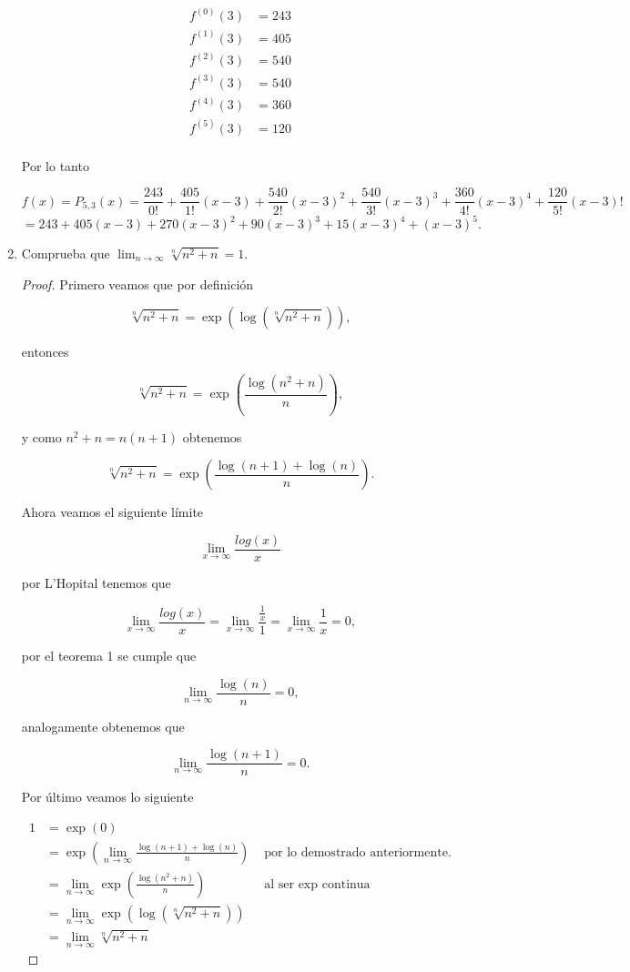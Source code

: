 \documentclass[letterpaper]{article}
\theoremstyle{definition}
\theoremstyle{lemathm}
\theoremstyle{lemademthm}
\newcommand{\limxinf}{\lim_{x\to\infty}}
\newcommand{\limninf}{\lim_{n\to\infty}}
\begin{document}
\begin{enumerate}
		\begin{align*}
			f^{(0)}(3) &= 243\\
			f^{(1)}(3) &= 405\\
			f^{(2)}(3) &= 540\\
			f^{(3)}(3) &= 540\\
			f^{(4)}(3) &= 360\\
			f^{(5)}(3) &= 120\\
		\end{align*}

		Por lo tanto

		\[f(x) = P_{5,3}(x) = \frac{243}{0!} + \frac{405}{1!}(x-3) + \frac{540}{2!}(x-3)^2 + \frac{540}{3!}(x-3)^3 + \frac{360}{4!}(x-3)^4 + \frac{120}{5!}(x-3)!\]
		\[= 243 + 405(x-3) + 270(x-3)^2 + 90(x-3)^3 + 15(x-3)^4 + (x-3)^5.\]

		\item Comprueba que $\limninf \sqrt[n]{n^2+n} = 1$.
		
		\begin{proof}
			Primero veamos que por definición

			\[\sqrt[n]{n^2+n} = \exp(\log(\sqrt[n]{n^2+n})),\]
			
			entonces

			\[\sqrt[n]{n^2+n} = \exp\left(\frac{\log(n^2+n)}{n}\right),\]

			y como $n^2 + n = n (n+1)$ obtenemos

			\[\sqrt[n]{n^2+n} = \exp\left(\frac{\log(n+1) + \log(n)}{n}\right).\]

			Ahora veamos el siguiente límite

			\[\limxinf \frac{log(x)}{x}\]

			por L'Hopital tenemos que

			\[\limxinf \frac{log(x)}{x} = \limxinf \frac{\frac{1}{x}}{1} = \limxinf \frac{1}{x} = 0,\]

			por el teorema 1 se cumple que

			\[\limninf \frac{\log(n)}{n} = 0,\]

			analogamente obtenemos que
			
			\[\limninf \frac{\log(n+1)}{n} = 0.\]

			Por último veamos lo siguiente

			\begin{align*}
				1 &= \exp(0)\\
				&= \exp\left(\limninf \frac{\log(n+1) + \log(n)}{n}\right) & \text{ por lo demostrado anteriormente.}\\
				&= \limninf \exp\left(\frac{\log(n^2+n)}{n}\right) & \text{ al ser exp continua}\\
				&= \limninf \exp(\log(\sqrt[n]{n^2+n}))\\
				&= \limninf \sqrt[n]{n^2+n}
			\end{align*}


\end{proof}
\end{enumerate}
\end{document}
